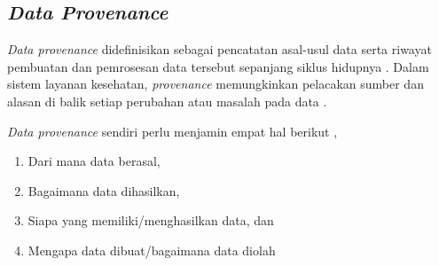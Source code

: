         


\subsection{\textit{Data Provenance}}\label{studi-data-provenance}

\textit{Data provenance} didefinisikan sebagai pencatatan asal-usul data serta riwayat pembuatan dan pemrosesan data tersebut sepanjang siklus hidupnya \parencite{Ahmed_2023_Data_Provenance}.
Dalam sistem layanan kesehatan, \textit{provenance} memungkinkan pelacakan sumber dan alasan di balik setiap perubahan atau masalah pada data \parencite{Ahmed_2023_Data_Provenance}. 

\textit{Data provenance} sendiri perlu menjamin empat hal berikut \parencite{Johns2023_Data_Provenance},

\begin{enumerate}
    \item Dari mana data berasal,
    \item Bagaimana data dihasilkan,
    \item Siapa yang memiliki/menghasilkan data, dan
    \item Mengapa data dibuat/bagaimana data diolah
\end{enumerate}


